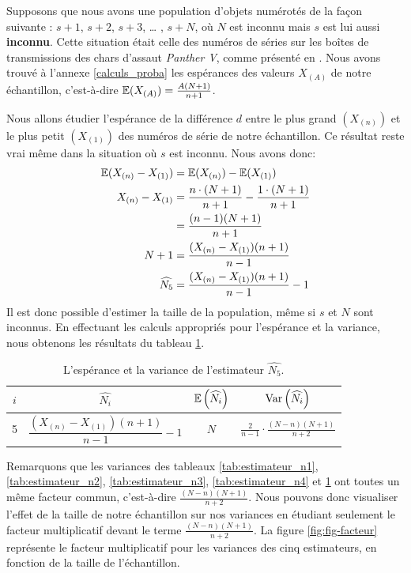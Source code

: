 \documentclass[10pt]{article}
\begin{document}
Supposons que nous avons une population d'objets numérotés de la façon
suivante : \(s+1\), \(s+2\), \(s+3\), \ldots{} , \(s+N\), où \(N\) est
inconnu mais \(s\) est lui aussi \textbf{inconnu}. Cette situation était
celle des numéros de séries sur les boîtes de transmissions des chars
d'assaut \emph{Panther V}, comme présenté en \cite{Ruggles1947}. Nous
avons trouvé à l'annexe \ref{calculs_proba} les espérances des valeurs
\(X_{(A)}\) de notre échantillon, c'est-à-dire
\(\operatorname{\mathbb{E}} (X_{(A)})=\frac{A(N+1)}{n+1}\).

Nous allons étudier l'espérance de la différence \(d\) entre le plus
grand \((X_{(n)})\) et le plus petit \((X_{(1)})\) des numéros de série
de notre échantillon. Ce résultat reste vrai même dans la situation où
\(s\) est inconnu. Nous avons donc: \begin{align*}
\operatorname{\mathbb{E}}(X_{(n)}-X_{(1)}) &= \operatorname{\mathbb{E}}(X_{(n)})-\operatorname{\mathbb{E}}(X_{(1)}) \\
X_{(n)}-X_{(1)} &= \dfrac{n\cdot(N+1)}{n+1}-\dfrac{1\cdot(N+1)}{n+1} \\
&= \dfrac{(n-1)(N+1)}{n+1} \\
N+1 &= \dfrac{(X_{(n)}-X_{(1)})(n+1)}{n-1} \\
\widehat{N_5} &= \dfrac{(X_{(n)}-X_{(1)})(n+1)}{n-1}-1
\end{align*} Il est donc possible d'estimer la taille de la population,
même si \(s\) et \(N\) sont inconnus. En effectuant les calculs
appropriés pour l'espérance et la variance, nous obtenons les résultats
du tableau \ref{tab:estimateur_n5}.

\begin{table}[ht]
\begin{center}
\begin{tabular}{|c|c|c|c|}
\hline
$i$ & $\widehat{N_i}$ & $\operatorname{\mathbb{E}}\left(\widehat{N_i}\right)$ & $\operatorname{Var}\left(\widehat{N_i}\right)$ \\
\hline
\hline
5 & $\dfrac{(X_{(n)}-X_{(1)})(n+1)}{n-1}-1$ & $N$ & $\frac{2}{n-1}\cdot\frac{(N-n)(N+1)}{n+2}$ \\
\hline
\end{tabular}
\end{center}
\caption{\label{tab:estimateur_n5} {L'espérance et la variance de l'estimateur $\widehat{N_5}$.} }
\end{table}

Remarquons que les variances des tableaux \ref{tab:estimateur_n1},
\ref{tab:estimateur_n2}, \ref{tab:estimateur_n3},
\ref{tab:estimateur_n4} et \ref{tab:estimateur_n5} ont toutes un même
facteur commun, c'est-à-dire \(\frac{(N-n)(N+1)}{n+2}\). Nous pouvons
donc visualiser l'effet de la taille de notre échantillon sur nos
variances en étudiant seulement le facteur multiplicatif devant le terme
\(\frac{(N-n)(N+1)}{n+2}\). La figure \ref{fig:fig-facteur} représente
le facteur multiplicatif pour les variances des cinq estimateurs, en
fonction de la taille de l'échantillon.
\end{document}
